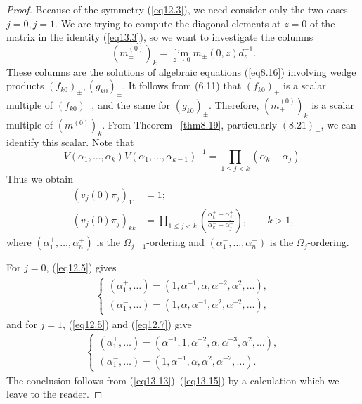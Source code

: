 \documentclass{surv-l}
\theoremstyle{plain}
\theoremstyle{definition}
\numberwithin{equation}{chapter}
\begin{document}
\begin{proof}
Because of the symmetry (\ref{eq12.3}), we need consider only the two cases $j=0, j =1$. We are trying to compute the diagonal elements at $z=0$ of the matrix in the identity (\ref{eq13.3}), so we want to investigate the columns
\begin{equation*}
(m_{\pm}^{(0)})_{k}=\lim_{z\rightarrow 0}m_{\pm}(0, z)d_{z}^{-1}.
\end{equation*}
These columns are the solutions of algebraic equations (\ref{eq8.16}) involving wedge products $(f_{k0})_{\pm}, (g_{k0})_{\pm}$. It follows from (6.11) that $(f_{k0})_{+}$ is a scalar multiple of $(f_{k0})_{-}$, and the same for $(g_{k0})_{\pm}$. Therefore, $(m_{+}^{(0)})_{k}$ is a scalar multiple of $(m_{-}^{(0)})_{k}$. From Theorem ~\ref{thm8.19}, particularly $(8.21)_{-}$, we can identify this scalar. Note that
\begin{equation*}
V(\alpha_{1}, \ldots, \alpha_{k})V(\alpha_{1},\ldots, \alpha_{k-1})^{-1}=\prod_{1\leq j<k}(\alpha_{k}-\alpha_{j}).
\end{equation*}
Thus we obtain
\begin{align}\label{eq13.13}
(v_{j}(0)\pi_{j})_{11}&=1;\\ \nonumber
 (v_{j}(0)\displaystyle \pi_{j})_{kk}&=\prod_{1\leq j<k}\left(\frac{\alpha_{k}^{+}-\alpha_{j}^{+}}{\alpha_{k}^{-}-\alpha_{j}^{-}}\right),\qquad k>1,
\end{align}
where $(\alpha_{1}^{+},\ldots,\alpha_{n}^{+})$ is the $\Omega_{j+1}$-ordering and $(\alpha_{1}^{-},\ldots, \alpha_{n}^{-})$ is the $\Omega_{j}$-ordering.

For $j=0$, (\ref{eq12.5}) gives
\begin{align}\label{eq13.14}
\left\{\begin{array}{l}
(\alpha_{1}^{+}, \ldots)=(1, \alpha^{-1},\alpha, \alpha^{-2}, \alpha^{2},\ldots),\\
(\alpha_{1}^{-}, \ldots)=(1, \alpha,\alpha^{-1}, \alpha^{2}, \alpha^{-2},\ldots),
\end{array}\right.
\end{align}
and for $j=1$, (\ref{eq12.5}) and (\ref{eq12.7}) give
\begin{align}\label{eq13.15}
\left\{\begin{array}{l}
(\alpha_{1}^{+},\ldots)=(\alpha^{-1}, 1, \alpha^{-2},\alpha, \alpha^{-3}, \alpha^{2},\ldots),\\
(\alpha_{1}^{-},\ldots)=(1, \alpha^{-1}, \alpha, \alpha^{2}, \alpha^{-2}, \ldots).
\end{array}\right.
\end{align}
The conclusion follows from (\ref{eq13.13})--(\ref{eq13.15}) by a calculation which we leave to the reader.
\end{proof}
\end{document}
